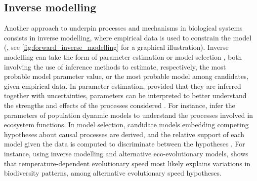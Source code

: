 \subsection{Inverse modelling}
Another approach to underpin processes and mechanisms in biological systems consists in inverse modelling, where empirical data is used to constrain the model (\cite{Clermont2015}, see \cref{fig:forward_inverse_modelling} for a graphical illustration).
% 
% 
% 
Inverse modelling can take the form of parameter estimation \citep{Schartau2017} or model selection \citep{Johnson2004}, both involving the use of inference methods to estimate, respectively, the most probable model parameter value, or the most probable model among candidates, given empirical data.
% 
% 
% 
% 
In parameter estimation, provided that they are inferred together with uncertainties, parameters can be interpreted to better understand the strengths and effects of the processes considered \citep{Pontarp2019}. For instance, \cite{Higgins2010,Curtsdotter2019} infer the parameters of population dynamic models to understand the processes involved in ecosystem functions.
%
In model selection, candidate models embedding competing hypotheses about causal processes are derived, and the relative support of each model given the data is computed to discriminate between the hypotheses \citep{Johnson2004}. For instance, using inverse modelling and alternative eco-evolutionary models, \citep{Skeels2022} shows that temperature-dependent evolutionary speed most likely explains variations in biodiversity patterns, among alternative evolutionary speed hypotheses.

